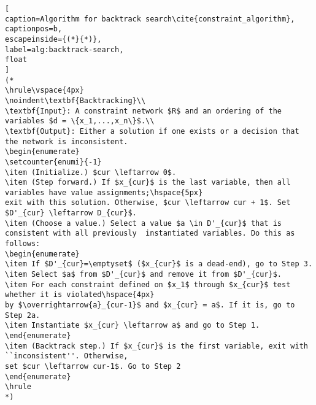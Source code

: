 \begin{lstlisting}[
caption=Algorithm for backtrack search\cite{constraint_algorithm}, 
captionpos=b, 
escapeinside={(*}{*)}, 
label=alg:backtrack-search,
float
]
(*
\hrule\vspace{4px}
\noindent\textbf{Backtracking}\\
\textbf{Input}: A constraint network $R$ and an ordering of the variables $d = \{x_1,...,x_n\}$.\\
\textbf{Output}: Either a solution if one exists or a decision that the network is inconsistent.
\begin{enumerate}
\setcounter{enumi}{-1}
\item (Initialize.) $cur \leftarrow 0$.
\item (Step forward.) If $x_{cur}$ is the last variable, then all variables have value assignments;\hspace{5px}
exit with this solution. Otherwise, $cur \leftarrow cur + 1$. Set $D'_{cur} \leftarrow D_{cur}$.
\item (Choose a value.) Select a value $a \in D'_{cur}$ that is consistent with all previously  instantiated variables. Do this as follows:
\begin{enumerate} 
\item If $D'_{cur}=\emptyset$ ($x_{cur}$ is a dead-end), go to Step 3.
\item Select $a$ from $D'_{cur}$ and remove it from $D'_{cur}$.
\item For each constraint defined on $x_1$ through $x_{cur}$ test whether it is violated\hspace{4px}
by $\overrightarrow{a}_{cur-1}$ and $x_{cur} = a$. If it is, go to Step 2a.
\item Instantiate $x_{cur} \leftarrow a$ and go to Step 1.
\end{enumerate}
\item (Backtrack step.) If $x_{cur}$ is the first variable, exit with ``inconsistent''. Otherwise,
set $cur \leftarrow cur-1$. Go to Step 2
\end{enumerate}
\hrule
*)
\end{lstlisting}